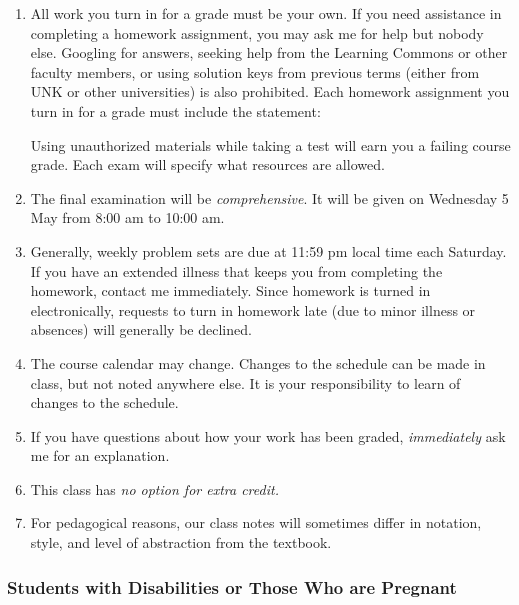 \documentclass[12pt,fullpage]{article}
\newcounter{ex}\setcounter{ex}{0}
\begin{document}
\begin{enumerate}

\item All work you turn in for a grade must be your own.  If you need assistance in completing a homework assignment, you may ask me for help but nobody else. Googling for
answers, seeking help from the Learning Commons or other faculty members,  or using solution keys from previous terms (either from UNK or other universities) is also prohibited.  Each homework assignment you turn in for a grade must include the statement:

\begin{quote}
\end{quote}
Using unauthorized materials while taking a test will earn you a failing course grade. Each exam will specify what resources are allowed. 

 \item The final examination will be \emph{comprehensive}. It will be given on Wednesday 5 May from 8:00 am to 10:00 am.


 \item Generally, weekly problem sets are due at 11:59 pm local time each Saturday. If you have an extended illness that keeps you from completing the homework, contact me immediately. Since homework is turned in electronically, requests to 
turn in homework late (due to minor illness or absences) will generally be declined.


\item The course calendar may change. Changes to the schedule can be made in class, but not noted anywhere else. It is your responsibility to
learn of changes to the schedule.



\item If you have questions about how your work has been graded,  \emph{immediately}  ask me for an explanation.

\item This class has \emph{no option for extra credit.}


\item  For pedagogical reasons, our class notes will sometimes differ in notation, style, and level of abstraction from the textbook.


\end{enumerate}




\subsubsection*{Students with Disabilities or Those Who are Pregnant}
\end{document}
